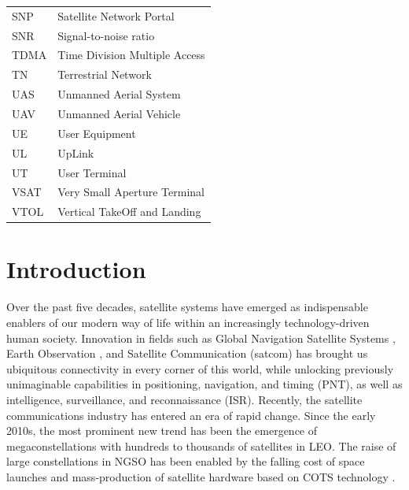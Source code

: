 \documentclass[english, 12pt, a4paper, elec, utf8, a-1b, online]{aaltothesis}
\begin{document}
\begin{tabular}{ll}
SNP                     & Satellite Network Portal \\
SNR                     & Signal-to-noise ratio \\
TDMA                    & Time Division Multiple Access \\
TN                      & Terrestrial Network \\
UAS                     & Unmanned Aerial System \\
UAV                     & Unmanned Aerial Vehicle \\
UE                      & User Equipment \\
UL                      & UpLink \\
UT                      & User Terminal \\
VSAT                    & Very Small Aperture Terminal \\
VTOL                    & Vertical TakeOff and Landing
\end{tabular}

\cleardoublepage

\section{Introduction}


Over the past five decades, satellite systems have emerged as indispensable enablers of our modern way of life within an increasingly technology-driven human society.
Innovation in fields such as Global Navigation Satellite Systems \cite{oconnor2019economic}, Earth Observation \cite{lupi2022socioeconomic, tassa2020socioeconomic}, and Satellite Communication (satcom) \cite{euroconsult-space-economy-2023} has brought us ubiquitous connectivity in every corner of this world, while unlocking previously unimaginable capabilities in positioning, navigation, and timing (PNT), as well as intelligence, surveillance, and reconnaissance (ISR).
Recently, the satellite communications industry has entered an era of rapid change.
Since the early 2010s, the most prominent new trend has been the emergence of megaconstellations with hundreds to thousands of satellites in LEO.
The raise of large constellations in NGSO has been enabled by the falling cost of space launches and mass-production of satellite hardware based on COTS technology \cite{euroconsult-space-economy-2023}.
\end{document}
